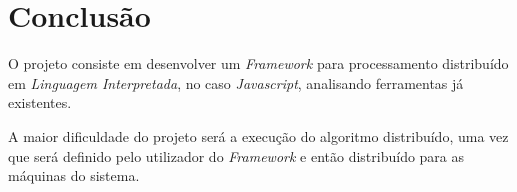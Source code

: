 \chapter{Conclus\~{a}o}
\label{conclusao}
O projeto consiste em desenvolver um \emph{Framework} para processamento
distribuído em \emph{Linguagem Interpretada}, no caso \emph{Javascript}, analisando
ferramentas já existentes.

A maior dificuldade do projeto será a execução do algoritmo distribuído, uma vez
que será definido pelo utilizador do \emph{Framework} e então distribuído para
as máquinas do sistema.
